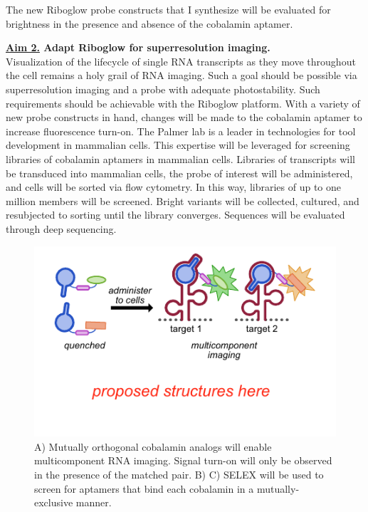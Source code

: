 The new Riboglow probe constructs that I synthesize will be evaluated for brightness in the presence and absence of the cobalamin aptamer.

\textbf{\underline{Aim 2.} Adapt Riboglow for superresolution imaging.}\\
Visualization of the lifecycle of single RNA transcripts as they move throughout the cell remains a holy grail of RNA imaging.\comment{[Cite]} Such a goal should be possible via superresolution imaging and a probe with adequate photostability. Such requirements should be achievable with the Riboglow platform. With a variety of new probe constructs in hand, changes will be made to the cobalamin aptamer to increase fluorescence turn-on. The Palmer lab is a leader in technologies for tool development in mammalian cells.\comment{[Cite]} This expertise will be leveraged for screening libraries of cobalamin aptamers in mammalian cells. Libraries of transcripts will be transduced into mammalian cells, the probe of interest will be administered, and cells will be sorted via flow cytometry.
In this way, libraries of up to one million members will be screened. Bright variants will be collected, cultured, and resubjected to sorting until the library converges. Sequences will be evaluated through deep sequencing.

\begin{figure}
\begin{centering}
\includegraphics[width=\textwidth]{figures/fig3.pdf}

\end{centering}
\footnotesize
\caption{\label{figure:multicomponent}
A) Mutually orthogonal cobalamin analogs will enable multicomponent RNA imaging. Signal turn-on will only be observed in the presence of the matched pair. B) C) SELEX will be used to screen for aptamers that bind each cobalamin in a mutually-exclusive manner.
}
\end{figure}

